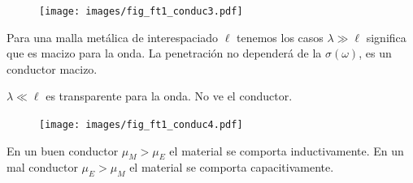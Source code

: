 \documentclass[10pt,oneside]{CBFT_book}
\begin{document}
\begin{figure}[htb]
	\begin{center}
	\texttt{[image: images/fig\_ft1\_conduc3.pdf]}	 
	\end{center}
	\caption{}
\end{figure} 

Para una malla metálica de interespaciado $\ell$ tenemos los casos
$\lambda \gg \ell$ significa que es macizo para la onda. La penetración no dependerá
de la $\sigma(\omega)$, es un conductor macizo.

$\lambda \ll \ell$ es transparente para la onda. No ve el conductor.

\begin{figure}[htb]
	\begin{center}
	\texttt{[image: images/fig\_ft1\_conduc4.pdf]}	 
	\end{center}
	\caption{}
\end{figure} 

En un buen conductor $ \mu_M > \mu_E $ el material se comporta inductivamente.
En un mal conductor $ \mu_E > \mu_M $ el material se comporta capacitivamente.


\end{document}
